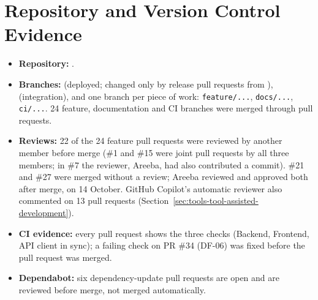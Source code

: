 \section{Repository and Version Control Evidence}\label{sec:repository-version-control-evidence}
\begin{itemize}
\item \textbf{Repository:} .
\item \textbf{Branches:}  (deployed; changed only by release pull requests from ),  (integration), and one branch per piece of work: \texttt{feature/...}, \texttt{docs/...}, \texttt{ci/...}. 24 feature, documentation and CI branches were merged through pull requests.
\item \textbf{Reviews:} 22 of the 24 feature pull requests were reviewed by another member before merge (\#1 and \#15 were joint pull requests by all three members; in \#7 the reviewer, Areeba, had also contributed a commit). \#21 and \#27 were merged without a review; Areeba reviewed and approved both after merge, on 14 October. GitHub Copilot's automatic reviewer also commented on 13 pull requests (Section~\ref{sec:tools-tool-assisted-development}).
\item \textbf{CI evidence:} every pull request shows the three checks (Backend, Frontend, API client in sync); a failing check on PR \#34 (DF-06) was fixed before the pull request was merged.
\item \textbf{Dependabot:} six dependency-update pull requests are open and are reviewed before merge, not merged automatically.
\end{itemize}

